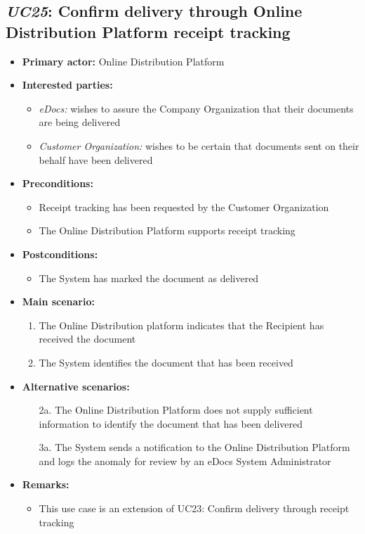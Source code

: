 \documentclass[a4paper,10pt]{article}
\begin{document}
\subsection{\emph{UC25}: Confirm delivery through Online Distribution Platform receipt tracking}
\begin{itemize}
	\item \textbf{Primary actor:} Online Distribution Platform
	\item \textbf{Interested parties:} 
	\begin{itemize}
		\item \textit{eDocs:} wishes to assure the Company Organization that their documents are being delivered
		\item \textit{Customer Organization:} wishes to be certain that documents sent on their behalf have been delivered
	\end{itemize}
	
	\item \textbf{Preconditions:}
	\begin{itemize}
		\item Receipt tracking has been requested by the Customer Organization
		\item The Online Distribution Platform supports receipt tracking
	\end{itemize}
	
	\item \textbf{Postconditions:}
	\begin{itemize}
		\item The System has marked the document as delivered
	\end{itemize}
	
	\item \textbf{Main scenario:} 
	\begin{enumerate}
		\item The Online Distribution platform indicates that the Recipient has received the document
		\item The System identifies the document that has been received
	\end{enumerate}
	
	\item \textbf{Alternative scenarios:} 
	\begin{enumerate}
		\item [2a.] The Online Distribution Platform does not supply sufficient information to identify the document that has been delivered
		\item [3a.] The System sends a notification to the Online Distribution Platform and logs the anomaly for review by an eDocs System Administrator
	\end{enumerate}
	
	\item \textbf{Remarks:}
	\begin{itemize}
		\item This use case is an extension of UC23: Confirm delivery through receipt tracking
	\end{itemize}
\end{itemize}
\end{document}
